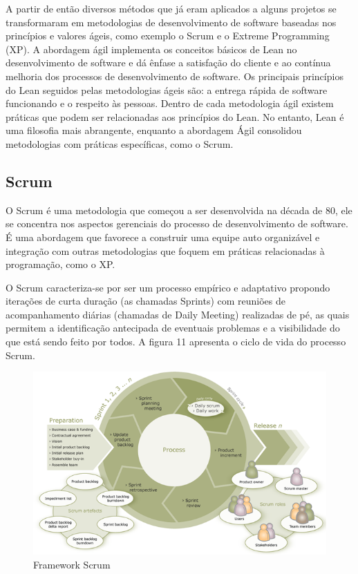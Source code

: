 A partir de então diversos métodos que já eram aplicados a alguns projetos se transformaram em metodologias de desenvolvimento de software baseadas nos princípios e valores ágeis, como exemplo o Scrum e o Extreme Programming (XP). A abordagem ágil implementa os conceitos básicos de Lean no desenvolvimento de software e dá ênfase a satisfação do cliente e ao contínua melhoria dos processos de desenvolvimento de software. Os principais princípios do Lean seguidos pelas metodologias ágeis são: a entrega rápida de software funcionando e o respeito às pessoas. Dentro de cada metodologia ágil existem práticas que podem ser relacionadas aos princípios do Lean. No entanto, Lean é uma filosofia mais abrangente, enquanto a abordagem Ágil consolidou metodologias com práticas específicas, como o Scrum. 

\subsection[Scrum]{Scrum}

O Scrum é uma metodologia que começou a ser desenvolvida na década de 80, ele se concentra nos aspectos gerenciais do processo de desenvolvimento de software. É uma abordagem que favorece a construir uma equipe auto organizável e integração com outras metodologias que foquem em práticas relacionadas à programação, como o XP. 

O Scrum caracteriza-se por ser um processo empírico e adaptativo propondo iterações de curta duração (as chamadas Sprints) com reuniões de acompanhamento diárias (chamadas de Daily Meeting) realizadas de pé, as quais permitem a identificação antecipada de eventuais problemas e a visibilidade do que está sendo feito por todos. A figura 11 apresenta o ciclo de vida do processo Scrum.

\begin{figure}[h]
		\centering
		\label{fig01}
			\includegraphics[scale=0.9]{figuras/scrum.png}
		\caption{Framework Scrum  \cite{scrumprocess}}
\end{figure}

